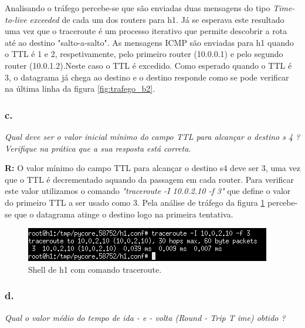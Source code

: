 \documentclass{llncs}
\begin{document}
Analisando o tráfego percebe-se que são enviadas duas mensagens do tipo \emph{Time-to-live exceeded} de cada um dos routers para h1. Já se esperava este resultado uma vez que o traceroute é um processo iterativo que permite descobrir a rota até ao destino "salto-a-salto".
As mensagens ICMP são enviadas para h1 quando o TTL é 1 e 2, respetivamente, pelo primeiro router (10.0.0.1) e pelo segundo router (10.0.1.2).Neste caso o TTL é excedido.
Como esperado quando o TTL é 3, o datagrama já chega ao destino e o destino responde como se pode verificar na última linha da figura \ref{fig:trafego_b2}.


\subsubsection{c.}
\emph{Qual  deve  ser  o  valor 
inicial 
mínimo
do  campo  TTL  para  alcançar  o 
destino 
s
4
? 
Verifique na prática que a sua resposta está correta.}

\textbf{R:} O valor mínimo do campo TTL para alcançar o destino s4 deve ser 3, uma vez que o TTL é decrementado aquando da passagem em cada router. Para verificar este valor utilizamos o comando  \emph{"traceroute -I 10.0.2.10 -f 3"} que define o valor do primeiro TTL a ser usado como 3. Pela análise de tráfego da figura \ref{fig:shell_c} percebe-se que o datagrama atinge o destino logo na primeira tentativa.
\begin{figure}
\begin{center}
\includegraphics[scale=0.54]{shell_c.png} 
\end{center}
\caption{\label{fig:shell_c}Shell de h1 com comando traceroute.}
\end{figure}

\subsubsection{d.}
\emph{Qual o 
valor
médio 
do tempo de ida
-
e
-
volta (Round
-
Trip T
ime)
obtido
? }
\end{document}
